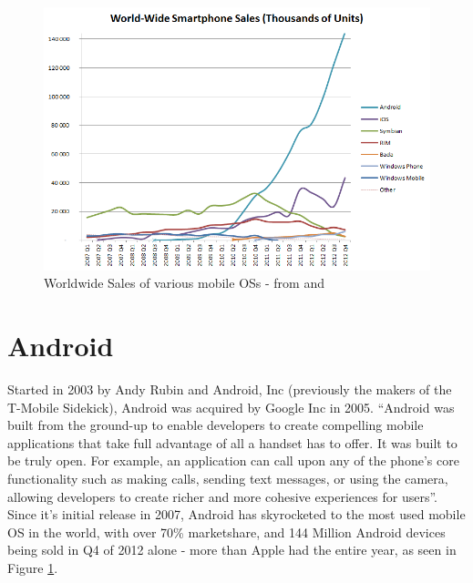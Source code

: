 \begin{figure}[h]
\begin{center}
\includegraphics[width=0.8\columnwidth]{figs/World_Wide_Smartphone_Sales}
\caption{Worldwide Sales of various mobile OSs - from \citep{wikimobilesales} and \citep{gartnerq42012}}
\label{fig:mobilesales}
\end{center}
\end{figure}


\section{Android}
Started in 2003 by Andy Rubin and Android, Inc (previously the makers of the T-Mobile Sidekick), Android was acquired by Google Inc in 2005\citep{businessweek2005}. ``Android was built from the ground-up to enable developers to create compelling mobile applications that take full advantage of all a handset has to offer. It was built to be truly open. For example, an application can call upon any of the phone’s core functionality such as making calls, sending text messages, or using the camera, allowing developers to create richer and more cohesive experiences for users''\citep{ohaandroidoverview}. Since it's initial release in 2007\citep{oharelease2007}, Android has skyrocketed to the most used mobile OS in the world, with over 70\% marketshare, and 144 Million Android devices being sold in Q4 of 2012 alone\citep{gartnerq42012} - more than Apple had the entire year, as seen in Figure \ref{fig:mobilesales}.




